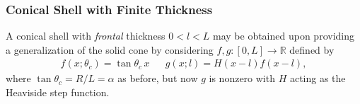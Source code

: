 \documentclass[11pt,dvipsnames]{thesis}
\begin{document}
\subsubsection{Conical Shell with Finite Thickness}
A conical shell with \textit{frontal} thickness $0 < l < L$ may be obtained upon providing a generalization of the solid cone by considering $f,g : [0, L] \to \mathbb{R}$ defined by 
\begin{align}
f(x; \theta_c) = \tan\theta_c \,x && g(x; l) = H(x - l)f(x - l),
\end{align}
where $\tan\theta_c = R/L = \alpha$ as before, but now $g$ is nonzero with $H$ acting as the Heaviside step function. 
\end{document}
